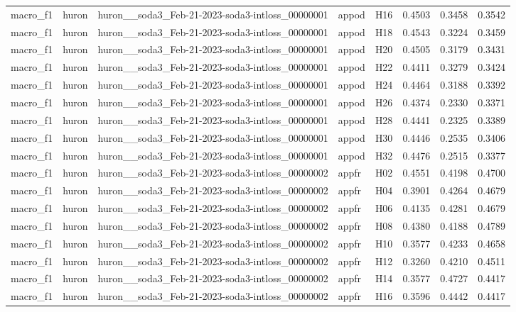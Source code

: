 \begin{table}[tbp]
\begin{tabular}{lllllrrr}
macro\_f1 & huron & huron\_\_soda3\_Feb-21-2023-soda3-intloss\_00000001 & appod & H16 & 0.4503 & 0.3458 & 0.3542 \\
macro\_f1 & huron & huron\_\_soda3\_Feb-21-2023-soda3-intloss\_00000001 & appod & H18 & 0.4543 & 0.3224 & 0.3459 \\
macro\_f1 & huron & huron\_\_soda3\_Feb-21-2023-soda3-intloss\_00000001 & appod & H20 & 0.4505 & 0.3179 & 0.3431 \\
macro\_f1 & huron & huron\_\_soda3\_Feb-21-2023-soda3-intloss\_00000001 & appod & H22 & 0.4411 & 0.3279 & 0.3424 \\
macro\_f1 & huron & huron\_\_soda3\_Feb-21-2023-soda3-intloss\_00000001 & appod & H24 & 0.4464 & 0.3188 & 0.3392 \\
macro\_f1 & huron & huron\_\_soda3\_Feb-21-2023-soda3-intloss\_00000001 & appod & H26 & 0.4374 & 0.2330 & 0.3371 \\
macro\_f1 & huron & huron\_\_soda3\_Feb-21-2023-soda3-intloss\_00000001 & appod & H28 & 0.4441 & 0.2325 & 0.3389 \\
macro\_f1 & huron & huron\_\_soda3\_Feb-21-2023-soda3-intloss\_00000001 & appod & H30 & 0.4446 & 0.2535 & 0.3406 \\
macro\_f1 & huron & huron\_\_soda3\_Feb-21-2023-soda3-intloss\_00000001 & appod & H32 & 0.4476 & 0.2515 & 0.3377 \\
macro\_f1 & huron & huron\_\_soda3\_Feb-21-2023-soda3-intloss\_00000002 & appfr & H02 & 0.4551 & 0.4198 & 0.4700 \\
macro\_f1 & huron & huron\_\_soda3\_Feb-21-2023-soda3-intloss\_00000002 & appfr & H04 & 0.3901 & 0.4264 & 0.4679 \\
macro\_f1 & huron & huron\_\_soda3\_Feb-21-2023-soda3-intloss\_00000002 & appfr & H06 & 0.4135 & 0.4281 & 0.4679 \\
macro\_f1 & huron & huron\_\_soda3\_Feb-21-2023-soda3-intloss\_00000002 & appfr & H08 & 0.4380 & 0.4188 & 0.4789 \\
macro\_f1 & huron & huron\_\_soda3\_Feb-21-2023-soda3-intloss\_00000002 & appfr & H10 & 0.3577 & 0.4233 & 0.4658 \\
macro\_f1 & huron & huron\_\_soda3\_Feb-21-2023-soda3-intloss\_00000002 & appfr & H12 & 0.3260 & 0.4210 & 0.4511 \\
macro\_f1 & huron & huron\_\_soda3\_Feb-21-2023-soda3-intloss\_00000002 & appfr & H14 & 0.3577 & 0.4727 & 0.4417 \\
macro\_f1 & huron & huron\_\_soda3\_Feb-21-2023-soda3-intloss\_00000002 & appfr & H16 & 0.3596 & 0.4442 & 0.4417 \\

\end{tabular}
\end{table}
